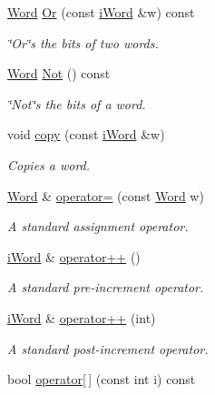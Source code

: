 \begin{DoxyCompactItemize}
\hyperlink{classWord}{Word} \hyperlink{classWord_a681da292897265ae47f144a99d49d9ec}{Or} (const \hyperlink{classiWord}{iWord} \&w) const 
\begin{DoxyCompactList}\small\item\em \char`\"{}Or\char`\"{}s the bits of two words. \item\end{DoxyCompactList}\item 
\hyperlink{classWord}{Word} \hyperlink{classWord_afdecfa9e3f2fda36496f249617a4cef5}{Not} () const 
\begin{DoxyCompactList}\small\item\em \char`\"{}Not\char`\"{}s the bits of a word. \item\end{DoxyCompactList}\item 
void \hyperlink{classWord_a2e48d9b78f13d08e7817c392fdc76b27}{copy} (const \hyperlink{classiWord}{iWord} \&w)
\begin{DoxyCompactList}\small\item\em Copies a word. \item\end{DoxyCompactList}\item 
\hyperlink{classWord}{Word} \& \hyperlink{classWord_a2a3d8ab2639aada7a1aafcd3acd3900f}{operator=} (const \hyperlink{classWord}{Word} w)
\begin{DoxyCompactList}\small\item\em A standard assignment operator. \item\end{DoxyCompactList}\item 
\hyperlink{classiWord}{iWord} \& \hyperlink{classWord_a3837f49bcb44597e6d738ccb0eeed144}{operator++} ()
\begin{DoxyCompactList}\small\item\em A standard pre-\/increment operator. \item\end{DoxyCompactList}\item 
\hyperlink{classiWord}{iWord} \& \hyperlink{classWord_ae921b75d263be790fd150c5962445163}{operator++} (int)
\begin{DoxyCompactList}\small\item\em A standard post-\/increment operator. \item\end{DoxyCompactList}\item 
bool \hyperlink{classWord_a0b08a81ced05b38d3d719ef70ecb3215}{operator\mbox{[}$\,$\mbox{]}} (const int i) const 

\end{DoxyCompactItemize}
